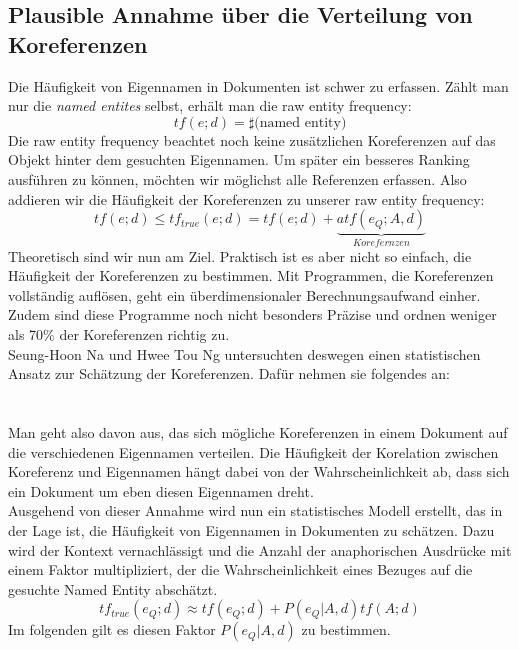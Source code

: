 \subsection{Plausible Annahme über die Verteilung von Koreferenzen}
Die Häufigkeit von Eigennamen in Dokumenten ist schwer zu erfassen. Zählt man nur die \textit{named entites} selbst, erhält man die raw entity frequency:
\[tf\left( e;d \right)=\sharp \text{(named entity)}\]
Die raw entity frequency beachtet  noch keine zusätzlichen Koreferenzen auf das Objekt hinter dem gesuchten Eigennamen. Um später ein besseres Ranking ausführen zu können, möchten wir möglichst alle Referenzen erfassen. Also addieren wir die Häufigkeit der Koreferenzen zu unserer raw entity frequency:
\[tf\left( e;d \right)\leq tf_{true}\left( e;d \right)=tf\left( e;d \right)+\underbrace{atf(e_Q;A,d)}_{Korefernzen}\]
Theoretisch sind wir nun am Ziel. Praktisch ist es aber nicht so einfach, die Häufigkeit der Koreferenzen zu bestimmen. Mit Programmen, die Koreferenzen vollständig auflösen, geht ein überdimensionaler Berechnungsaufwand einher. Zudem sind diese Programme noch nicht besonders Präzise und ordnen weniger als 70\% der Koreferenzen richtig zu.\cite{paper:Na}
\\
Seung-Hoon Na und Hwee Tou Ng untersuchten deswegen einen statistischen Ansatz zur Schätzung der Koreferenzen. Dafür nehmen sie folgendes an:
\\
\\
\\
Man geht also davon aus, das sich mögliche Koreferenzen in einem Dokument auf die verschiedenen Eigennamen verteilen. Die Häufigkeit der Korelation zwischen Koreferenz und Eigennamen hängt dabei von der Wahrscheinlichkeit ab, dass sich ein Dokument um eben diesen Eigennamen dreht.\\
Ausgehend von dieser Annahme wird nun ein statistisches Modell erstellt, das in der Lage ist, die Häufigkeit von Eigennamen in Dokumenten zu schätzen. Dazu wird der Kontext vernachlässigt und die Anzahl der anaphorischen Ausdrücke mit einem Faktor multipliziert, der die Wahrscheinlichkeit eines Bezuges auf die gesuchte Named Entity abschätzt.
\[ tf_{true} \left( e_Q ; d \right) \approx tf \left( e_Q ; d \right) + P\left( e_Q | A,d \right)tf\left( A;d \right) \]
Im folgenden gilt es diesen Faktor $P\left( e_Q | A,d \right)$ zu bestimmen.
